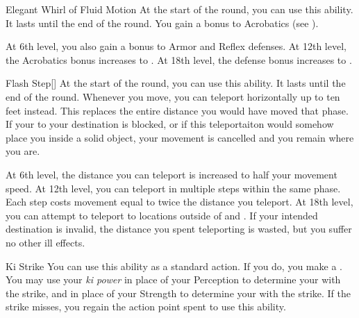 {            \begin{ability}{Elegant Whirl of Fluid Motion}
                At the start of the round, you can use this ability.
                It lasts until the end of the round.
                You gain a  bonus to Acrobatics (see ).

                At 6th level, you also gain a  bonus to Armor and Reflex defenses.
                At 12th level, the Acrobatics bonus increases to .
                At 18th level, the defense bonus increases to .
            \end{ability}

            \begin{ability}{Flash Step}[]
                At the start of the round, you can use this ability.
                It lasts until the end of the round.
                Whenever you move, you can teleport horizontally up to ten feet instead.
                This replaces the entire distance you would have moved that phase.
                If your  to your destination is blocked, or if this teleportaiton would somehow place you inside a solid object, your movement is cancelled and you remain where you are.

                At 6th level, the distance you can teleport is increased to half your movement speed.
                At 12th level, you can teleport in multiple steps within the same phase.
                Each step costs movement equal to twice the distance you teleport.
                At 18th level, you can attempt to teleport to locations outside of  and .
                If your intended destination is invalid, the distance you spent teleporting is wasted, but you suffer no other ill effects.
            \end{ability}

            \begin{ability}{Ki Strike}
                You can use this ability as a standard action.
                If you do, you make a .
                You may use your \textit{ki power} in place of your Perception to determine your  with the strike, and in place of your Strength to determine your  with the strike.
                If the strike misses, you regain the action point spent to use this ability.


\end{ability}}
